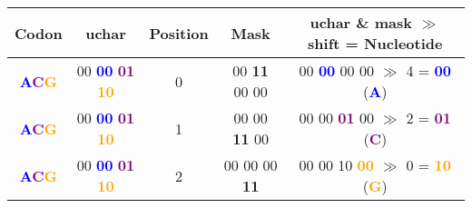 \newcommand{\cBlue}[1]{\textbf{\textcolor{blue}{#1}}}
\newcommand{\cPurple}[1]{\textbf{\textcolor{purple}{#1}}}
\newcommand{\cOrange}[1]{\textbf{\textcolor{orange}{#1}}}

\begingroup\centering
\begin{tabular}{c|c|c|c|c}
Codon & uchar & Position & Mask & uchar \& mask $\gg$ shift = Nucleotide\\
\hline
\cBlue{A}\cPurple{C}\cOrange{G} & 00 \cBlue{00} \cPurple{01} \cOrange{10} & 0 & 00 \textbf{11} 00 00 & 00 \cBlue{00} 00 00 $\gg$ 4 \hspace{0.8em}= \cBlue{00} (\cBlue{A})\\
\cBlue{A}\cPurple{C}\cOrange{G} & 00 \cBlue{00} \cPurple{01} \cOrange{10} & 1 & 00 00 \textbf{11} 00 & 00 00 \cPurple{01} 00 $\gg$ 2 \hspace{0.8em}= \cPurple{01} (\cPurple{C})\\
\cBlue{A}\cPurple{C}\cOrange{G} & 00 \cBlue{00} \cPurple{01} \cOrange{10} & 2 & 00 00 00 \textbf{11} & 00 00 10 \cOrange{00} $\gg$ 0 \hspace{0.8em}= \cOrange{10} (\cOrange{G})\\
\end{tabular}
\par\endgroup